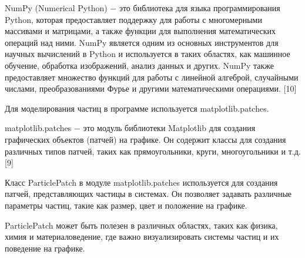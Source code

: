 NumPy (Numerical Python) $-$ это библиотека для языка программирования Python, которая предоставляет поддержку для работы с многомерными массивами и матрицами, а также функции для выполнения математических операций над ними. NumPy является одним из основных инструментов для научных вычислений в Python и используется в таких областях, как машинное обучение, обработка изображений, анализ данных и других. NumPy также предоставляет множество функций для работы с линейной алгеброй, случайными числами, преобразованиями Фурье и другими математическими операциями. [10]

Для моделирования частиц в программе используется matplotlib.patches.

matplotlib.patches $-$ это модуль библиотеки Matplotlib для создания графических объектов (патчей) на графике. Он содержит классы для создания различных типов патчей, таких как прямоугольники, круги, многоугольники и т.д. [9]

Класс ParticlePatch в модуле matplotlib.patches используется для создания патчей, представляющих частицы в системах. Он позволяет задавать различные параметры частиц, такие как размер, цвет и положение на графике.

ParticlePatch может быть полезен в различных областях, таких как физика, химия и материаловедение, где важно визуализировать системы частиц и их поведение на графике.